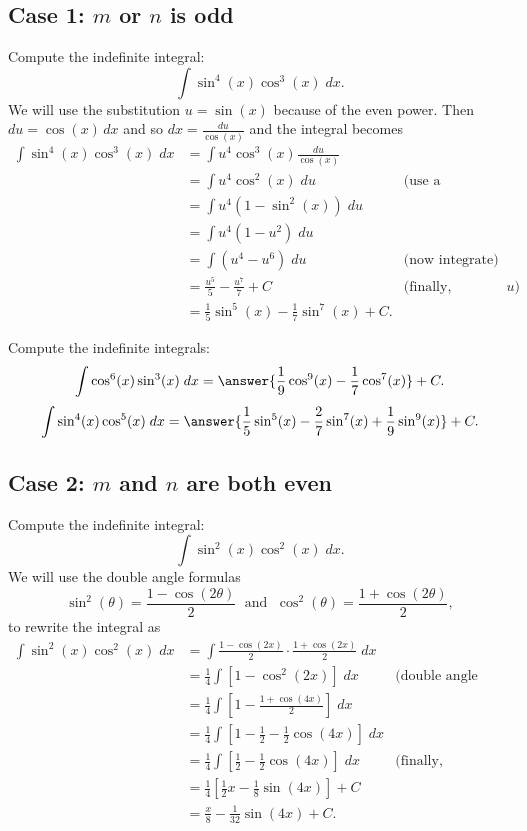 \documentclass{ximera}
\begin{document}
\subsection{Case 1: $m$ or $n$ is odd}
\begin{example}
Compute the indefinite integral:
\[
\int \sin^4(x)\cos^3(x) \; dx.
\]
We will use the substitution $u = \sin(x)$ because of the even power.
Then $du = \cos(x) \, dx$ and so $dx = \frac{du}{\cos(x)}$ and the integral becomes
\begin{align*}
\int \sin^4(x)\cos^3(x) \; dx &= \int u^4 \cos^3(x) \frac{du}{\cos(x)}\\
   &= \int u^4 \cos^2(x) \; du &
   \text{(use a Pythagorean identity)}\\
   &= \int u^4 (1-\sin^2(x)) \; du\\
   &= \int u^4 (1-u^2) \; du\\
   &= \int (u^4 -u^6) \; du &
  \text{(now integrate)}\\
  &= \frac{u^5}{5} - \frac{u^7}{7} + C &  \text{(finally, substitute for $u$)}\\
  &= \frac15 \sin^5(x) - \frac17 \sin^7(x) + C.
\end{align*}
  
\end{example}

\begin{problem}
Compute the indefinite integrals:
\[
\int \cos^6(x)\sin^3(x) \; dx = \answer{\frac19 \cos^9(x) - \frac17 \cos^7(x)} + C.
\]
\[
\int \sin^4(x)\cos^5(x) \; dx = \answer{\frac15 \sin^5(x) - \frac27 \sin^7(x)+\frac19 \sin^9(x)} + C.
\]
\end{problem}

\subsection{Case 2: $m$ and $n$ are both even}
\begin{example}
Compute the indefinite integral:
\[
\int \sin^2(x)\cos^2(x) \; dx.
\]
We will use the double angle formulas
\[
\sin^2(\theta) = \frac{1-\cos(2\theta)}{2} \; \text{ and } \; \cos^2(\theta) = \frac{1+\cos(2\theta)}{2},
\]
to rewrite the integral as
\begin{align*}
\int \sin^2(x)\cos^2(x) \; dx &= \int \frac{1-\cos(2x)}{2}\cdot \frac{1+\cos(2x)}{2} \; dx\\
  &= \frac14 \int \left[1 - \cos^2(2x)\right] \; dx &
  \text{(double angle formula again)}\\
  &= \frac14 \int \left[ 1- \frac{1+\cos(4x)}{2}\right] \; dx\\
  &= \frac14 \int \left[1-\frac12 - \frac12\cos(4x)\right] \; dx\\
  &= \frac14 \int \left[\frac12 - \frac12\cos(4x)\right] \; dx & \text{(finally, integrate)}\\
  &= \frac14 \left[\frac12 x  - \frac18\sin(4x)\right] + C\\
  &= \frac{x}{8}  - \frac{1}{32}\sin(4x) + C.
\end{align*}
\end{example}
\end{document}
